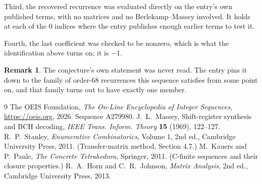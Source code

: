 \documentclass[11pt,a4paper]{article}
\theoremstyle{plain}
\theoremstyle{definition}
\newtheorem{remark}[theorem]{Remark}
\begin{document}
Third, the recovered recurrence was evaluated directly on the entry's own published terms, with
no matrices and no Berlekamp--Massey involved. It holds at each of the $0$ indices where
the entry publishes enough earlier terms to test it.

Fourth, the last coefficient was checked to be nonzero, which is what the identification above
turns on; it is $-1$.

\begin{remark}
The conjecture's own statement was never read. The entry pins it down to the family of
order-$68$ recurrences this sequence satisfies from some point on, and that family turns
out to have exactly one member.
\end{remark}

\begin{thebibliography}{9}
 The OEIS Foundation, \emph{The On-Line Encyclopedia of Integer
Sequences}, \url{https://oeis.org}, 2026. Sequence A279980.
 J.~L.~Massey, Shift-register synthesis and BCH decoding, \emph{IEEE
Trans. Inform. Theory} \textbf{15} (1969), 122--127.
 R.~P.~Stanley, \emph{Enumerative Combinatorics}, Volume 1, 2nd ed.,
Cambridge University Press, 2011. (Transfer-matrix method, Section 4.7.)
 M.~Kauers and P.~Paule, \emph{The Concrete Tetrahedron}, Springer, 2011.
(C-finite sequences and their closure properties.)
 R.~A.~Horn and C.~R.~Johnson, \emph{Matrix Analysis}, 2nd ed., Cambridge
University Press, 2013.
\end{thebibliography}
\end{document}
